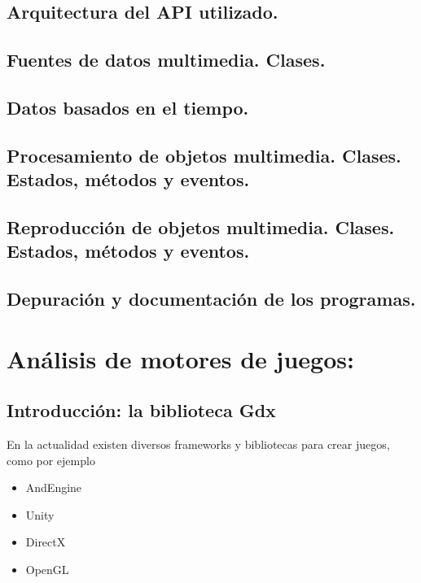 \documentclass[a4paper,12pt,spanish]{sphinxmanual}
\begin{document}
\section{Arquitectura del API utilizado.}
\label{tema3:arquitectura-del-api-utilizado}

\section{Fuentes de datos multimedia. Clases.}
\label{tema3:fuentes-de-datos-multimedia-clases}

\section{Datos basados en el tiempo.}
\label{tema3:datos-basados-en-el-tiempo}

\section{Procesamiento de objetos multimedia. Clases. Estados, métodos y eventos.}
\label{tema3:procesamiento-de-objetos-multimedia-clases-estados-metodos-y-eventos}

\section{Reproducción de objetos multimedia. Clases. Estados, métodos y eventos.}
\label{tema3:reproduccion-de-objetos-multimedia-clases-estados-metodos-y-eventos}

\section{Depuración y documentación de los programas.}
\label{tema3:depuracion-y-documentacion-de-los-programas}

\chapter{Análisis de motores de juegos:}
\label{tema4::doc}\label{tema4:analisis-de-motores-de-juegos}

\section{Introducción: la biblioteca Gdx}
\label{tema4:introduccion-la-biblioteca-gdx}
En la actualidad existen diversos frameworks y bibliotecas para crear juegos, como por ejemplo
\begin{itemize}
\item {} 
AndEngine

\item {} 
Unity

\item {} 
DirectX

\item {} 
OpenGL

\end{itemize}
\end{document}
